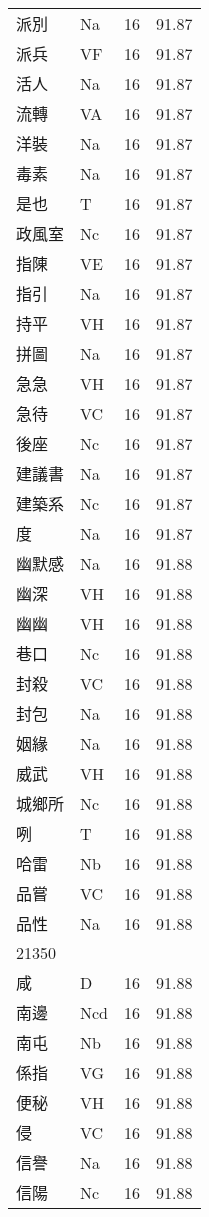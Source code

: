 \documentclass[twocolumn]{book}
\begin{document}
\begin{supertabular}{llrr}
派別 & Na & 16 &  91.87\\
派兵 & VF & 16 &  91.87\\
活人 & Na & 16 &  91.87\\
流轉 & VA & 16 &  91.87\\
洋裝 & Na & 16 &  91.87\\
毒素 & Na & 16 &  91.87\\
是也 & T & 16 &  91.87\\
政風室 & Nc & 16 &  91.87\\
指陳 & VE & 16 &  91.87\\
指引 & Na & 16 &  91.87\\
持平 & VH & 16 &  91.87\\
拼圖 & Na & 16 &  91.87\\
急急 & VH & 16 &  91.87\\
急待 & VC & 16 &  91.87\\
後座 & Nc & 16 &  91.87\\
建議書 & Na & 16 &  91.87\\
建築系 & Nc & 16 &  91.87\\
度 & Na & 16 &  91.87\\
幽默感 & Na & 16 &  91.88\\
幽深 & VH & 16 &  91.88\\
幽幽 & VH & 16 &  91.88\\
巷口 & Nc & 16 &  91.88\\
封殺 & VC & 16 &  91.88\\
封包 & Na & 16 &  91.88\\
姻緣 & Na & 16 &  91.88\\
威武 & VH & 16 &  91.88\\
城鄉所 & Nc & 16 &  91.88\\
咧 & T & 16 &  91.88\\
哈雷 & Nb & 16 &  91.88\\
品嘗 & VC & 16 &  91.88\\
品性 & Na & 16 &  91.88\\
21350\\
咸 & D & 16 &  91.88\\
南邊 & Ncd & 16 &  91.88\\
南屯 & Nb & 16 &  91.88\\
係指 & VG & 16 &  91.88\\
便秘 & VH & 16 &  91.88\\
侵 & VC & 16 &  91.88\\
信譽 & Na & 16 &  91.88\\
信陽 & Nc & 16 &  91.88\\

\end{supertabular}
\end{document}
